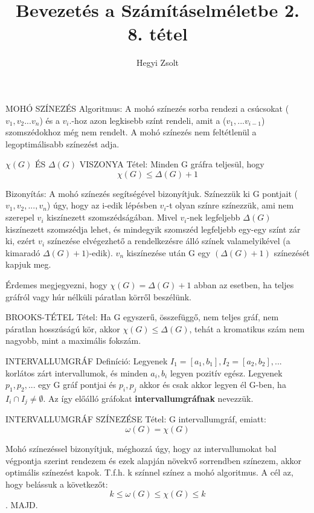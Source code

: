 \documentclass[]{article}
\title{Bevezetés a Számításelméletbe 2.\\{\large 8. tétel}}
\author{Hegyi Zsolt}
\begin{document}
\maketitle
\begin{framed}
MOHÓ SZÍNEZÉS Algoritmus: A mohó színezés sorba rendezi a csúcsokat ($v_1, v_2...v_n$) és a $v_i.$-hoz azon legkisebb színt rendeli, amit a ($v_1,...v_{i-1}$) szomszédokhoz még nem rendelt. A mohó színezés nem feltétlenül a legoptimálisabb színezést adja.
\end{framed}
\begin{framed}
$\chi(G)$ ÉS $\Delta(G)$ VISZONYA Tétel: Minden	G gráfra teljesül, hogy
$$\chi(G) \leq \Delta(G)+1$$
\end{framed}
\begin{leftbar}
Bizonyítás: A mohó színezés segítségével bizonyítjuk. Színezzük ki G pontjait ($v_1, v_2,..., v_n$) úgy, hogy az i-edik lépésben $v_i$-t olyan színre színezzük, ami nem szerepel $v_i$ kiszínezett szomszédságában. Mivel $v_i$-nek legfeljebb $\Delta(G)$ kiszínezett szomszédja lehet, és mindegyik szomszéd legfeljebb egy-egy színt zár ki, ezért $v_i$ színezése elvégezhető a rendelkezésre álló színek valamelyikével (a kimaradó $\Delta(G)+1)$-edik). $v_n$ kiszínezése után G egy $(\Delta(G)+1)$ színezését kapjuk meg.
\end{leftbar}
Érdemes megjegyezni, hogy $\chi(G) = \Delta(G)+1$ abban az esetben, ha teljes gráfról vagy húr nélküli páratlan körről beszélünk.
\begin{framed}
BROOKS-TÉTEL Tétel: Ha G egyszerű, összefüggő, nem teljes gráf, nem páratlan hosszúságú kör, akkor $\chi(G) \leq \Delta(G)$, tehát a kromatikus szám nem nagyobb, mint a maximális fokszám.
\end{framed}
\begin{shaded}
INTERVALLUMGRÁF Definíció: Legyenek $I_1 = [a_1, b_1], I_2 = [a_2, b_2],...$ korlátos zárt intervallumok, és minden $a_i, b_i$ legyen pozitív egész. Legyenek $p_1, p_2,...$ egy G gráf pontjai és ${p_i, p_j}$ akkor és csak akkor legyen él G-ben, ha $I_i\cap I_j \not= \emptyset$. Az így előálló gráfokat \textbf{intervallumgráfnak} nevezzük.
\end{shaded}
\begin{framed}
INTERVALLUMGRÁF SZÍNEZÉSE Tétel: G intervallumgráf, emiatt:
$$\omega(G) = \chi(G)$$
\end{framed}
\begin{leftbar}
Mohó színezéssel bizonyítjuk, méghozzá úgy, hogy az intervallumokat bal végpontja szerint rendezem és ezek alapján növekvő sorrendben színezem, akkor optimális színezést kapok. T.f.h. k színnel színez a mohó algoritmus. A cél az, hogy belássuk a következőt:
$$k \leq \omega(G) \leq \chi(G) \leq k$$. MAJD.
\end{leftbar}
\end{document}
